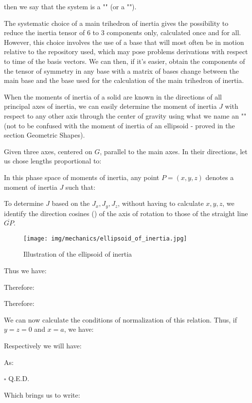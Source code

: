     then we say that the system is a "" (or a "").
    \begin{tcolorbox}[title=Remark,colframe=black,arc=10pt]
	The systematic choice of a main trihedron of inertia gives the possibility to reduce the inertia tensor of $6$ to $3$ components only, calculated once and for all. However, this choice involves the use of a base that will most often be in motion relative to the repository used, which may pose problems derivations with respect to time of the basis vectors. We can then, if it's easier, obtain the components of the tensor of symmetry in any base with a matrix of bases change between the main base and the base used for the calculation of the main trihedron of inertia.
	\end{tcolorbox}
	\begin{theorem}
    When the moments of inertia of a solid are known in the directions of all principal axes of inertia, we can easily determine the moment of inertia $J$ with respect to any other axis through the center of gravity using what we name an "" (not to be confused with the moment of inertia of an ellipsoid - proved in the section Geometric Shapes).
    \end{theorem}
    \begin{dem}
    Given three axes, centered on $G$, parallel to the main axes. In their directions, let us chose lengths proportional to:
    
    
    In this phase space of moments of inertia, any point $P=(x,y,z)$ denotes a moment of inertia $J$ such that:
    
    To determine $J$ based on the $J_x,J_y,J_z$, without having to calculate $x, y, z$, we identify the direction cosines () of the axis of rotation to those of the straight line $\overline{GP}$.
    \begin{figure}[H]
		\centering
		\texttt{[image: img/mechanics/ellipsoid\_of\_inertia.jpg]}
		\caption{Illustration of the ellipsoid of inertia}
	\end{figure}
    Thus we have:
    
    Therefore:
    
    Therefore:
    
    We can now calculate the conditions of normalization of this relation. Thus, if $y=z=0$ and $x=a$, we have:
    
    Respectively we will have:
    
    As:
      
	\begin{flushright}
		$\square$  Q.E.D.
	\end{flushright}
    \end{dem}
    Which brings us to write:
    

